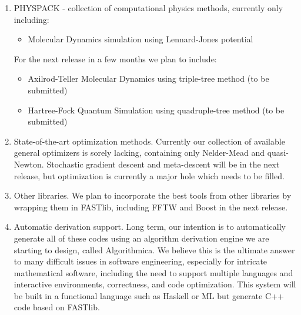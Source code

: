 \documentclass[letter]{report}
\begin{document}
\begin{enumerate}
\item PHYSPACK - collection of computational physics methods, currently only including:
  \begin{itemize}
  \item Molecular Dynamics simulation using Lennard-Jones potential
  \end{itemize}
For the next release in a few months we plan to include:
  \begin{itemize}
  \item Axilrod-Teller Molecular Dynamics using triple-tree method (to be submitted)
  \item Hartree-Fock Quantum Simulation using quadruple-tree method (to be submitted)
  \end{itemize}

\item State-of-the-art optimization methods.  Currently our collection of
available general optimizers is sorely lacking, containing only
Nelder-Mead and quasi-Newton.  Stochastic gradient descent and
meta-descent will be in the next release, but optimization is
currently a major hole which needs to be filled.  

\item Other libraries.  We plan to incorporate the best tools from other
libraries by wrapping them in FASTlib, including FFTW and Boost in the 
next release.

\item Automatic derivation support.  Long term, our intention is to 
automatically generate all of these codes using an algorithm
derivation engine we are starting to design, called
Algorithmica.  We believe this is the ultimate answer to many
difficult issues in software engineering, especially for intricate
mathematical software, including the need to support multiple
languages and interactive environments, correctness, and code
optimization.  This system will be built in a functional language such 
as Haskell or ML but generate C++ code based on FASTlib.

\end{enumerate}
\end{document}
